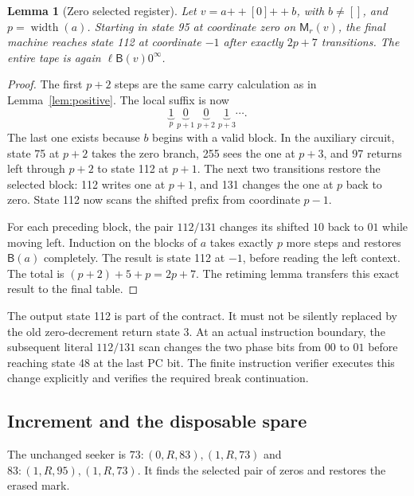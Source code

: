\documentclass[11pt]{article}
\newtheorem{lemma}{Lemma}
\newcommand{\B}{\mathsf B}
\newcommand{\M}{\mathsf M}
\newcommand{\width}{\operatorname{width}}
\newcommand{\concat}{\mathbin{+\!+}}
\begin{document}
\begin{lemma}[Zero selected register]\label{lem:zero}
Let $v=a\concat[0]\concat b$, with $b\ne[]$, and $p=\width(a)$.
Starting in state 95 at coordinate zero on $\M_r(v)$, the final machine
reaches state 112 at coordinate $-1$ after exactly $2p+7$ transitions.
The entire tape is again $\ell\B(v)0^\infty$.
\end{lemma}
\begin{proof}
The first $p+2$ steps are the same carry calculation as in
Lemma~\ref{lem:positive}.  The local suffix is now
\[
 \underbrace{1}_{p}\;
 \underbrace{0}_{p+1}\;
 \underbrace{0}_{p+2}\;
 \underbrace{1}_{p+3}\cdots .
\]
The last one exists because $b$ begins with a valid block.  In the
auxiliary circuit, state 75 at $p+2$ takes the zero branch, 255 sees the
one at $p+3$, and 97 returns left through $p+2$ to state 112 at $p+1$.
The next two transitions restore the selected block: 112 writes one at
$p+1$, and 131 changes the one at $p$ back to zero.  State 112 now scans
the shifted prefix from coordinate $p-1$.

For each preceding block, the pair $112/131$ changes its shifted $10$
back to $01$ while moving left.  Induction on the blocks of $a$ takes
exactly $p$ more steps and restores $\B(a)$ completely.  The result is
state 112 at $-1$, before reading the left context.  The total is
$(p+2)+5+p=2p+7$.  The retiming lemma transfers this exact result to the
final table.
\end{proof}

The output state 112 is part of the contract.  It must not be silently
replaced by the old zero-decrement return state 3.  At an actual
instruction boundary, the subsequent literal $112/131$ scan changes
the two phase bits from $00$ to $01$ before reaching state 48 at the
last PC bit.  The finite instruction verifier executes this change
explicitly and verifies the required break continuation.

\subsection{Increment and the disposable spare}

The unchanged seeker is
$73:(0,R,83),(1,R,73)$ and
$83:(1,R,95),(1,R,73)$.
It finds the selected pair of zeros and restores the erased mark.
\end{document}
